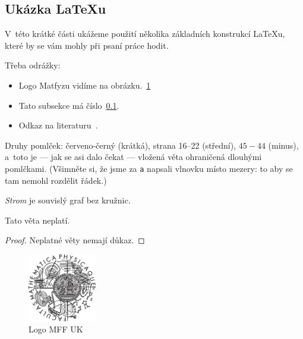 
\subsection{Ukázka \LaTeX{}u}
\label{ssec:ukazka}

V~této krátké části ukážeme použití několika základních konstrukcí \LaTeX{}u,
které by se vám mohly při psaní práce hodit.

Třeba odrážky:

\begin{itemize}
\item Logo Matfyzu vidíme na obrázku.~\ref{fig:mff}
\item Tato subsekce má číslo~\ref{ssec:ukazka}.
\item Odkaz na literaturu~\cite{lamport94}.
\end{itemize}

Druhy pomlček:
červeno-černý (krátká),
strana 16--22 (střední),
$45-44$ (minus),
a~toto je --- jak se asi dalo čekat --- vložená věta ohraničená dlouhými pomlčkami.
(Všimněte si, že jsme za \verb|a| napsali vlnovku místo mezery: to aby se
tam nemohl rozdělit řádek.)



\begin{define}
{\sl Strom} je souvislý graf bez kružnic.
\end{define}


\begin{theorem}
Tato věta neplatí.
\end{theorem}


\begin{proof}
Neplatné věty nemají důkaz.
\end{proof}

\begin{figure}
	\centering
	\includegraphics[width=30mm]{./img/logo.eps}
	\caption{Logo MFF UK}
	\label{fig:mff}
\end{figure}

